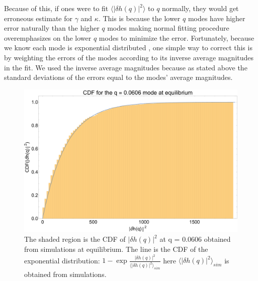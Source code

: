 \documentclass[amsmath,preprintnumbers,10pt,nofootinbib,prl,twocolumn]{revtex4-1}
\begin{document}
Because of this, if ones were to fit $\langle |\delta h(q)|^2\rangle$ to $q$ normally, they would get erroneous estimate for $\gamma$ and $\kappa$. This is because the lower $q$ modes have higher error naturally than the higher $q$ modes making normal fitting procedure overemphasizes on the lower $q$ modes to minimize the error. Fortunately, because we know each mode is exponential distributed , one simple way to correct this is by weighting the errors of the modes according to its inverse average magnitudes in the fit. We used the inverse average magnitudes because as stated above the standard deviations of the errors equal to the modes' average magnitudes. 
\begin{figure}
\centering
\includegraphics[scale=0.2]{CDFatequilibriumformodeq=0d0606.pdf}
\caption{The shaded region is the CDF of $|\delta h(q)|^2$ at q = 0.0606 obtained from simulations at equilibrium. The line is the CDF of the exponential distribution: $1-\exp{\frac{|\delta h(q)|^2}{\langle |\delta h(q)|^2\rangle_{sim}}}$ here $\langle |\delta h(q)|^2\rangle_{sim}$ is obtained from simulations. }  \label{fig:expdistributionateq}
\end{figure}
\end{document}

